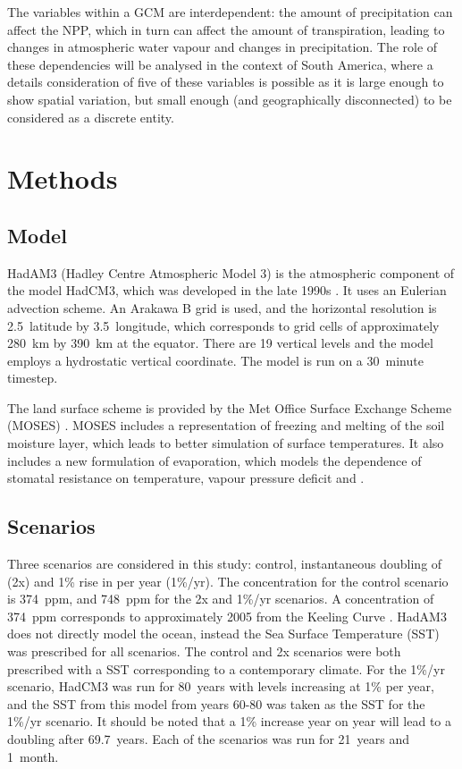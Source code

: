 \documentclass{article}
\begin{document}
The variables within a GCM are interdependent: the amount of precipitation can affect the NPP, which in turn can affect the amount of transpiration, leading to changes in atmospheric water vapour and changes in precipitation. The role of these dependencies will be analysed in the context of South America, where a details consideration of five of these variables is possible as it is large enough to show spatial variation, but small enough (and geographically disconnected) to be considered as a discrete entity.

\section{Methods}

\subsection{Model}

HadAM3 (Hadley Centre Atmospheric Model 3) is the atmospheric component of the model HadCM3, which was developed in the late 1990s \parencite{pope2000impact}. It uses an Eulerian advection scheme. An Arakawa B grid is used, and the horizontal resolution is 2.5\textdegree\,  latitude by 3.5\textdegree\, longitude, which corresponds to grid cells of approximately \SI{280}{km} by \SI{390}{km} at the equator. There are 19 vertical levels and the model employs a hydrostatic vertical coordinate. The model is run on a \SI{30}{minute} timestep.

The land surface scheme is provided by the Met Office Surface Exchange Scheme (MOSES) \parencite{cox1999impact}. MOSES includes a representation of freezing and melting of the soil moisture layer, which leads to better simulation of surface temperatures. It also includes a new formulation of evaporation, which models the dependence of stomatal resistance on temperature, vapour pressure deficit and .


\subsection{Scenarios}

Three scenarios are considered in this study: control, instantaneous doubling of  (2x) and 1\% rise in  per year (1\%/yr). The  concentration for the control scenario is \SI{374}{ppm}, and \SI{748}{ppm} for the 2x and 1\%/yr scenarios. A concentration of \SI{374}{ppm} corresponds to approximately 2005 from the Keeling Curve \parencite{keeling1976atmospheric}. HadAM3 does not directly model the ocean, instead the Sea Surface Temperature (SST) was prescribed for all scenarios. The control and 2x scenarios were both prescribed with a SST corresponding to a contemporary climate. For the 1\%/yr scenario, HadCM3 was run for \SI{80}{years} with  levels increasing at 1\% per year, and the SST from this model from years 60-80 was taken as the SST for the 1\%/yr scenario. It should be noted that a 1\% increase year on year will lead to a doubling after \SI{69.7}{years}.  Each of the scenarios was run for \SI{21}{years} and \SI{1}{month}.
\end{document}
